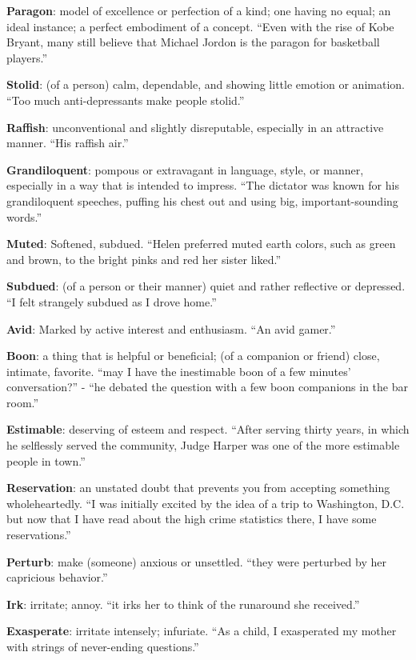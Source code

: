 \documentclass[12pt, a4paper]{ximera}
\begin{document}
\textbf{Paragon}: model of excellence or perfection of a kind; one having no equal; an ideal instance; a perfect embodiment of a concept. ``Even with the rise of Kobe Bryant, many still believe that Michael Jordon is the paragon for basketball players.''

\textbf{Stolid}: (of a person) calm, dependable, and showing little emotion or animation. ``Too much anti-depressants make people stolid.''

\textbf{Raffish}: unconventional and slightly disreputable, especially in an attractive manner. ``His raffish air.''

\textbf{Grandiloquent}: pompous or extravagant in language, style, or manner, especially in a way that is intended to impress. ``The dictator was known for his grandiloquent speeches, puffing his chest out and using big, important-sounding words.''

\textbf{Muted}: Softened, subdued. ``Helen preferred muted earth colors, such as green and brown, to the bright pinks and red her sister liked.''

\textbf{Subdued}: (of a person or their manner) quiet and rather reflective or depressed. ``I felt strangely subdued as I drove home.''

\textbf{Avid}: Marked by active interest and enthusiasm. ``An avid gamer.''

\textbf{Boon}: a thing that is helpful or beneficial;  (of a companion or friend) close, intimate, favorite. ``may I have the inestimable boon of a few minutes' conversation?'' - ``he debated the question with a few boon companions in the bar room.''

\textbf{Estimable}: deserving of esteem and respect. ``After serving thirty years, in which he selflessly served the community, Judge Harper was one of the more estimable people in town.''

\textbf{Reservation}: an unstated doubt that prevents you from accepting something wholeheartedly. ``I was initially excited by the idea of a trip to Washington, D.C. but now that I have read about the high crime statistics there, I have some reservations.''

\textbf{Perturb}: make (someone) anxious or unsettled. ``they were perturbed by her capricious behavior.''

\textbf{Irk}: irritate; annoy. ``it irks her to think of the runaround she received.''

\textbf{Exasperate}: irritate intensely; infuriate. ``As a child, I exasperated my mother with strings of never-ending questions.''
\end{document}
